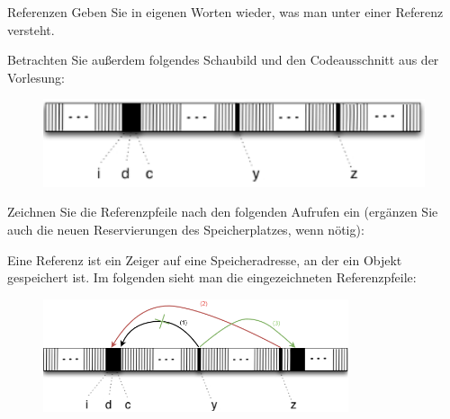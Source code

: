 \documentclass{../tuda-exercise}
\begin{document}
  \maketitle

  \begin{task}[credit=\stars{0}{3}]{Referenzen}
    Geben Sie in eigenen Worten wieder, was man unter einer Referenz versteht.

    \br

    Betrachten Sie außerdem folgendes Schaubild und den Codeausschnitt aus der Vorlesung:

    \begin{minipage}{0.45\textwidth}
      \begin{figure}[H]
        \includegraphics[width=1\textwidth]{graphics/V1_Task.png}
      \end{figure}
    \end{minipage}
    \hfill
    \begin{minipage}{0.45\textwidth}
      
    \end{minipage}

    Zeichnen Sie die Referenzpfeile nach den folgenden Aufrufen ein (ergänzen Sie auch die neuen
    Reservierungen des Speicherplatzes, wenn nötig):

    

    \begin{solution}
      Eine Referenz ist ein Zeiger auf eine Speicheradresse, an der ein Objekt gespeichert ist.
      \newpage
      Im folgenden sieht man die eingezeichneten Referenzpfeile:
      \begin{figure}[h]
        \centering
        \includegraphics[width=0.8\textwidth]{graphics/V1_Solution.png}
      \end{figure}
    \end{solution}
  \end{task}
\end{document}
